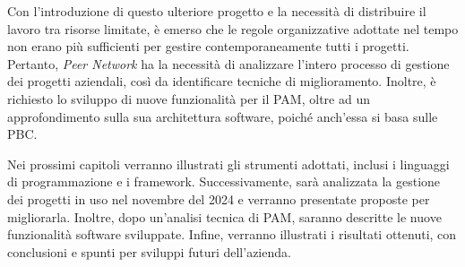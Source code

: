 Con l’introduzione di questo ulteriore progetto e la necessità di distribuire il lavoro tra risorse 
limitate, è emerso che le regole organizzative adottate nel tempo non erano più sufficienti per 
gestire contemporaneamente tutti i progetti. Pertanto, \textit{Peer Network} ha la necessità di analizzare 
l’intero processo di gestione dei progetti aziendali, così da identificare tecniche di miglioramento. 
Inoltre, è richiesto lo sviluppo di nuove funzionalità per il \ac{PAM}, oltre ad un approfondimento 
sulla sua architettura software, poiché anch'essa si basa sulle \ac{PBC}.

Nei prossimi capitoli verranno illustrati gli strumenti adottati, inclusi i linguaggi di programmazione 
e i framework. Successivamente, sarà analizzata la gestione dei progetti in uso nel novembre del 2024 
e verranno presentate proposte per migliorarla. Inoltre, dopo un’analisi tecnica di \ac{PAM}, saranno 
descritte le nuove funzionalità software sviluppate. Infine, verranno illustrati i risultati ottenuti, 
con conclusioni e spunti per sviluppi futuri dell'azienda.
